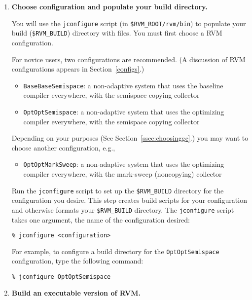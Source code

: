 \begin{enumerate}
\item {\bf Choose configuration and populate your build directory.}

You will use the {\tt jconfigure} script (in {\tt \$RVM\_ROOT/rvm/bin}) to
populate your build ({\tt \$RVM\_BUILD}) directory with files.  You must
first choose a RVM configuration.

For novice users, two configurations are recommended.  (A discussion
of RVM configurations appears in Section~\ref{configs}.)

\begin{itemize}
\item {\tt BaseBaseSemispace}: a non-adaptive system that uses the
baseline compiler everywhere, with the semispace copying collector
\item {\tt OptOptSemispace}: a non-adaptive system that uses the
optimizing compiler everywhere, with the semispace copying collector
\end{itemize}

Depending on your purposes (See Section~\ref{ssec:choosinggc}.) you
may want to choose another configuration, e.g.,
\begin{itemize}
\item {\tt OptOptMarkSweep}: a non-adaptive system that uses the
optimizing  compiler everywhere, with the mark-sweep (noncopying) collector
\end{itemize}

Run the {\tt jconfigure} script to set up the {\tt \$RVM\_BUILD}
directory for the configuration you desire.  This step creates
build scripts for your configuration and otherwise formats your
{\tt \$RVM\_BUILD} directory.
The {\tt jconfigure} script takes one argument, the name of the
configuration desired: 

\begin{verbatim}
% jconfigure <configuration>
\end{verbatim}

For example, to configure a build 
directory for the {\tt OptOptSemispace} configuration, type
the following command:

\begin{verbatim}
% jconfigure OptOptSemispace
\end{verbatim}

\item {\bf Build an executable version of RVM.}  


\end{enumerate}
